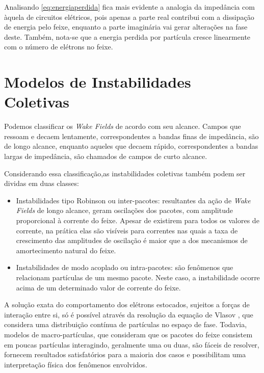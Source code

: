 Analisando \eqref{eq:energiaperdida} fica mais evidente a analogia da impedância com àquela de circuitos elétricos, pois apenas a parte real contribui com a dissipação de energia pelo feixe, enquanto a parte imaginária vai gerar alterações na fase deste. Também, nota-se que a energia perdida por partícula cresce linearmente com o número de elétrons no feixe.

\section{Modelos de Instabilidades Coletivas}

Podemos classificar os \textit{Wake Fields} de acordo com seu alcance. Campos que ressoam e decaem lentamente, correspondentes a bandas finas de impedância, são de longo alcance, enquanto aqueles que decaem rápido, correspondentes a bandas largas de impedância, são chamados de campos de curto alcance.

Considerando essa classificação,as instabilidades coletivas também podem ser dividas em duas classes:
\begin{itemize}
 \item Instabilidades tipo Robinson ou inter-pacotes: resultantes da ação de \textit{Wake Fields} de longo alcance, geram oscilações dos pacotes, com amplitude proporcional à corrente do feixe. Apesar de existirem para todos os valores de corrente, na prática elas são visíveis para correntes nas quais a taxa de crescimento das amplitudes de oscilação é maior que a dos mecanismos de amortecimento natural do feixe. 
 \item Instabilidades de modo acoplado ou intra-pacotes: são fenômenos que relacionam partículas de um mesmo pacote. Neste caso, a instabilidade ocorre acima de um determinado valor de corrente do feixe.
\end{itemize}

A solução exata do comportamento dos elétrons estocados, sujeitos a forças de interação entre si, só é possível através da resolução da equação de Vlasov \cite{Chao, Bio}, que considera uma distribuição contínua de partículas no espaço de fase. Todavia, modelos de macro-partículas, que consideram  que os
pacotes do feixe consistem em poucas partículas interagindo, geralmente uma ou duas, são fáceis de resolver, fornecem resultados satisfatórios para a maioria dos casos e possibilitam uma interpretação física dos fenômenos envolvidos. 

